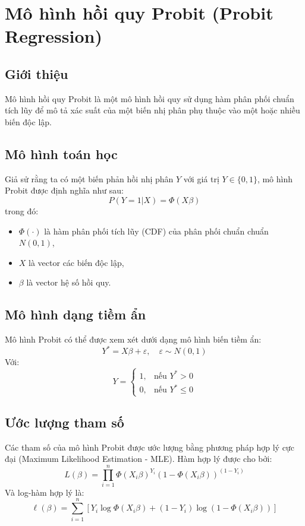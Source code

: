 \chapter{Mô hình hồi quy Probit (Probit Regression)}
\section{Giới thiệu}
Mô hình hồi quy Probit là một mô hình hồi quy sử dụng hàm phân phối chuẩn tích lũy để mô tả xác suất của một biến nhị phân phụ thuộc vào một hoặc nhiều biến độc lập.

\section{Mô hình toán học}
Giả sử rằng ta có một biến phản hồi nhị phân $Y$ với giá trị $Y \in \{0,1\}$, mô hình Probit được định nghĩa như sau:
\begin{equation}
    P(Y = 1 | X) = \Phi(X \beta)
\end{equation}
trong đó:
\begin{itemize}
    \item $\Phi(\cdot)$ là hàm phân phối tích lũy (CDF) của phân phối chuẩn chuẩn $N(0,1)$,
    \item $X$ là vector các biến độc lập,
    \item $\beta$ là vector hệ số hồi quy.
\end{itemize}

\section{Mô hình dạng tiềm ẩn}
Mô hình Probit có thể được xem xét dưới dạng mô hình biến tiềm ẩn:
\begin{equation}
    Y^* = X \beta + \varepsilon, \quad \varepsilon \sim N(0,1)
\end{equation}
Với:
\begin{equation}
    Y = \begin{cases} 
        1, & \text{nếu } Y^* > 0 \\
        0, & \text{nếu } Y^* \leq 0
    \end{cases}
\end{equation}

\section{Ước lượng tham số}
Các tham số của mô hình Probit được ước lượng bằng phương pháp hợp lý cực đại (Maximum Likelihood Estimation - MLE). Hàm hợp lý được cho bởi:
\begin{equation}
    L(\beta) = \prod_{i=1}^{n} \Phi(X_i \beta)^{Y_i} (1 - \Phi(X_i \beta))^{(1 - Y_i)}
\end{equation}
Và log-hàm hợp lý là:
\begin{equation}
    \ell(\beta) = \sum_{i=1}^{n} \left[ Y_i \log \Phi(X_i \beta) + (1 - Y_i) \log (1 - \Phi(X_i \beta)) \right]
\end{equation}

